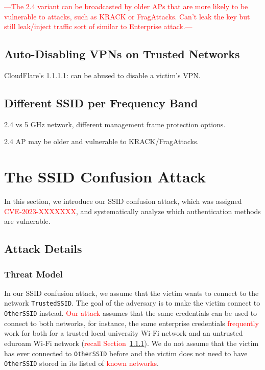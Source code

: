 \documentclass[sigconf,review]{acmart}
\newcommand{\wifi}{\mbox{Wi-Fi}}
\DeclareRobustCommand{\red}[1]{\textcolor{red}{#1}}
\begin{document}
\red{---The 2.4 variant can be broadcasted by older APs that are more likely to be vulnerable to attacks, such as KRACK or FragAttacks. Can't leak the key but still leak/inject traffic sort of similar to Enterprise attack.---}

\subsection{Auto-Disabling VPNs on Trusted Networks}

CloudFlare's 1.1.1.1: can be abused to disable a victim's VPN.

\subsection{Different SSID per Frequency Band}

2.4 vs 5 GHz network, different management frame protection options.

2.4 AP may be older and vulnerable to KRACK/FragAttacks.

\section{The SSID Confusion Attack}
\label{sec:attack}

In this section, we introduce our SSID confusion attack, which was assigned \red{CVE-2023-XXXXXXX}, and systematically analyze which authentication methods are vulnerable.

\subsection{Attack Details}

\subsubsection{Threat Model}

In our SSID confusion attack, we assume that the victim wants to connect to the network \verb|TrustedSSID|.
The goal of the adversary is to make the victim connect to \verb|OtherSSID| instead.
\red{Our attack} assumes that the same credentials can be used to connect to both networks, for instance, the same enterprise credentials \red{frequently} work for both for a trusted local university \wifi{} network and an untrusted eduroam \wifi{} network (\red{recall Section~\ref{}}).
We do not assume that the victim has ever connected to \verb|OtherSSID| before and the victim does not need to have \verb|OtherSSID| stored in its listed of \red{known networks}.
\end{document}
